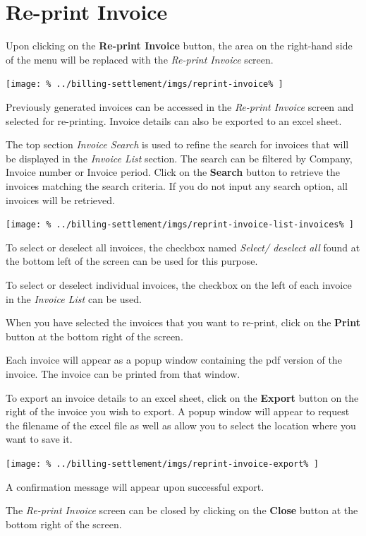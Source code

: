 \documentclass[../main/main]{subfiles}
\begin{document}
\newpage
\section{Re-print Invoice}
\label{sec:re-print-invoice}

Upon clicking on the \textbf{Re-print Invoice} button,
the area on the right-hand side of the menu will be replaced with the
\emph{Re-print Invoice} screen.

\texttt{[image: \%
  ../billing-settlement/imgs/reprint-invoice\%
]}

Previously generated invoices can be accessed in the \emph{Re-print Invoice}
screen and selected for re-printing. Invoice details can also be exported
to an excel sheet.

The top section \emph{Invoice Search} is used to refine the search for invoices
that will be displayed in the \emph{Invoice List} section.
The search can be filtered by Company, Invoice number or Invoice period.
Click on the \textbf{Search} button to retrieve the invoices matching the search
criteria. If you do not input any search option, all invoices will be retrieved.

\texttt{[image: \%
  ../billing-settlement/imgs/reprint-invoice-list-invoices\%
]}

\pagebreak
To select or deselect all invoices, the checkbox named
\emph{Select/ deselect all} found at the bottom left of the screen can be used
for this purpose.

To select or deselect individual invoices, the checkbox on the left of each
invoice in the \emph{Invoice List} can be used.

When you have selected the invoices that you want to re-print, click on the
\textbf{Print} button at the bottom right of the screen.

Each invoice will appear as a popup window containing the pdf version of
the invoice. The invoice can be printed from that window.

To export an invoice details to an excel sheet, click on the \textbf{Export}
button on the right of the invoice you wish to export. A popup window will
appear to request the filename of the excel file as well as allow you to select
the location where you want to save it.

\texttt{[image: \%
  ../billing-settlement/imgs/reprint-invoice-export\%
]}

A confirmation message will appear upon successful export.

The \emph{Re-print Invoice} screen can be closed by clicking on the
\textbf{Close} button at the bottom right of the screen.
\end{document}
